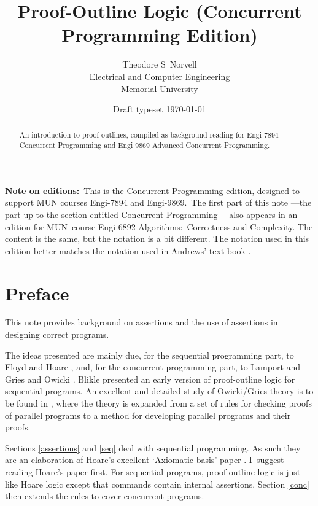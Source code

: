 \documentclass[11pt]{article}%
\begin{document}
\title{Proof-Outline Logic (Concurrent Programming Edition)}
\author{Theodore S\ Norvell\\Electrical and Computer Engineering\\Memorial University}
\date{Draft typeset
\today
}
\maketitle

\begin{abstract}
An introduction to proof outlines, compiled as background reading for Engi
7894 Concurrent Programming and Engi 9869 Advanced Concurrent Programming.

\end{abstract}

\textbf{Note on editions:}\ This is the Concurrent Programming edition,
designed to support MUN courses Engi-7894 and Engi-9869.\ The first part of
this note ---the part up to the section entitled Concurrent Programming---
also appears in an edition for MUN\ course Engi-6892 Algorithms:\ Correctness
and Complexity. The content is the same, but the notation is a bit different.
The notation used in this edition better matches the notation used in Andrews'
text book \cite{Andrews2000}.

\section{Preface}

This note provides background on assertions and the use of assertions in
designing correct programs.

The ideas presented are mainly due, for the sequential programming part, to
Floyd \cite{Floyd670} and Hoare \cite{Hoare690}, and, for the concurrent
programming part, to Lamport \cite{Lamport-1977} and Gries and Owicki
\cite{OwickiGries-1976-aptpp,OwickiGries-1976-vpppaa}. Blikle
\cite{Blikle1979} presented an early version of proof-outline logic for
sequential programs. An excellent and detailed study of Owicki/Gries theory is
to be found in \cite{FeijenVanGasteren990}, where the theory is expanded from
a set of rules for checking proofs of parallel programs to a method for
developing parallel programs and their proofs.

Sections \ref{assertions} and \ref{seq} deal with sequential programming. As
such they are an elaboration of Hoare's excellent `Axiomatic basis' paper
\cite{Hoare690}. I\ suggest reading Hoare's paper first. For sequential
programs, proof-outline logic is just like Hoare logic except that commands
contain internal assertions. Section \ref{conc} then extends the rules to
cover concurrent programs.
\end{document}

